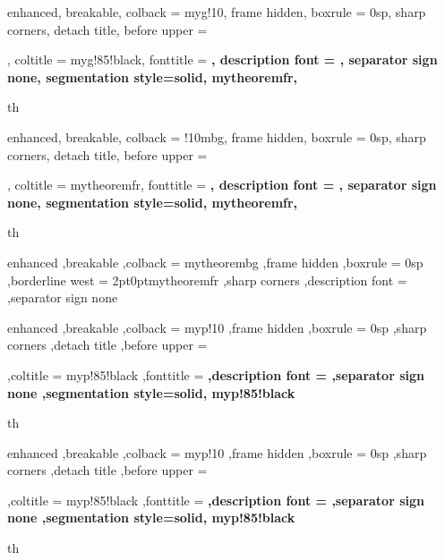 
\setlength{\parindent}{1cm}

{%
	enhanced,
	breakable,
	colback = myg!10,
	frame hidden,
	boxrule = 0sp,
	sharp corners,
	detach title,
	before upper = \tcbtitle\par\bigskip,
	coltitle = myg!85!black,
	fonttitle = \bfseries\sffamily,
	description font = \mdseries,
	separator sign none,
	segmentation style={solid, mytheoremfr},
}
{th}

{%
	enhanced,
	breakable,
	colback = !10mbg,
	frame hidden,
	boxrule = 0sp,
	sharp corners,
	detach title,
	before upper = \tcbtitle\par\bigskip,
	coltitle = mytheoremfr,
	fonttitle = \bfseries\sffamily,
	description font = \mdseries,
	separator sign none,
	segmentation style={solid, mytheoremfr},
}
{th}


{%
	enhanced
	,breakable
	,colback = mytheorembg
	,frame hidden
	,boxrule = 0sp
	,borderline west = {2pt}{0pt}{mytheoremfr}
	,sharp corners
	,description font = \mdseries
	,separator sign none
}


{%
	enhanced
	,breakable
	,colback = myp!10
	,frame hidden
	,boxrule = 0sp
	,sharp corners
	,detach title
	,before upper = \tcbtitle\par\smallskip
	,coltitle = myp!85!black
	,fonttitle = \bfseries\sffamily
	,description font = \mdseries
	,separator sign none
	,segmentation style={solid, myp!85!black}
}
{th}

{%
	enhanced
	,breakable
	,colback = myp!10
	,frame hidden
	,boxrule = 0sp
	,sharp corners
	,detach title
	,before upper = \tcbtitle\par\smallskip
	,coltitle = myp!85!black
	,fonttitle = \bfseries\sffamily
	,description font = \mdseries
	,separator sign none
	,segmentation style={solid, myp!85!black}
}
{th}

